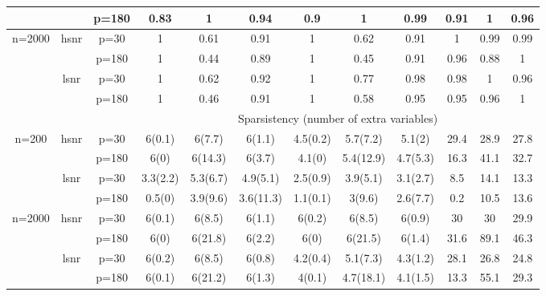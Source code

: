 \begin{table}[ht]
{\begin{tabular}{|c|c|c|ccc|ccc|ccc|}
   &  & p=180 & 0.83 & 1 & 0.94 & 0.9 & 1 & 0.99 & 0.91 & 1 & 0.96 \\ 
  \midrule \multirow{4}[4]{*}{n=2000} & \multirow{2}[2]{*}{hsnr} & p=30 & 1 & 0.61 & 0.91 & 1 & 0.62 & 0.91 & 1 & 0.99 & 0.99 \\ 
   &  & p=180 & 1 & 0.44 & 0.89 & 1 & 0.45 & 0.91 & 0.96 & 0.88 & 1 \\ 
  \cmidrule{2-12} & \multirow{2}[2]{*}{lsnr} & p=30 & 1 & 0.62 & 0.92 & 1 & 0.77 & 0.98 & 0.98 & 1 & 0.96 \\ 
   &  & p=180 & 1 & 0.46 & 0.91 & 1 & 0.58 & 0.95 & 0.95 & 0.96 & 1 \\ 
   \midrule 
 \multicolumn{1}{|r}{} & \multicolumn{1}{r}{} &       & \multicolumn{9}{c|}{Sparsistency (number of extra variables)} \\
 \midrule 
\multirow{4}[4]{*}{n=200} & \multirow{2}[2]{*}{hsnr} & p=30 & 6(0.1) & 6(7.7) & 6(1.1) & 4.5(0.2) & 5.7(7.2) & 5.1(2) & 29.4 & 28.9 & 27.8 \\ 
   &  & p=180 & 6(0) & 6(14.3) & 6(3.7) & 4.1(0) & 5.4(12.9) & 4.7(5.3) & 16.3 & 41.1 & 32.7 \\ 
  \cmidrule{2-12} & \multirow{2}[2]{*}{lsnr} & p=30 & 3.3(2.2) & 5.3(6.7) & 4.9(5.1) & 2.5(0.9) & 3.9(5.1) & 3.1(2.7) & 8.5 & 14.1 & 13.3 \\ 
   &  & p=180 & 0.5(0) & 3.9(9.6) & 3.6(11.3) & 1.1(0.1) & 3(9.6) & 2.6(7.7) & 0.2 & 10.5 & 13.6 \\ 
  \midrule \multirow{4}[4]{*}{n=2000} & \multirow{2}[2]{*}{hsnr} & p=30 & 6(0.1) & 6(8.5) & 6(1.1) & 6(0.2) & 6(8.5) & 6(0.9) & 30 & 30 & 29.9 \\ 
   &  & p=180 & 6(0) & 6(21.8) & 6(2.2) & 6(0) & 6(21.5) & 6(1.4) & 31.6 & 89.1 & 46.3 \\ 
  \cmidrule{2-12} & \multirow{2}[2]{*}{lsnr} & p=30 & 6(0.2) & 6(8.5) & 6(0.8) & 4.2(0.4) & 5.1(7.3) & 4.3(1.2) & 28.1 & 26.8 & 24.8 \\ 
   &  & p=180 & 6(0.1) & 6(21.2) & 6(1.3) & 4(0.1) & 4.7(18.1) & 4.1(1.5) & 13.3 & 55.1 & 29.3 \\ 
   \bottomrule 
\end{tabular}
}
\end{table}
